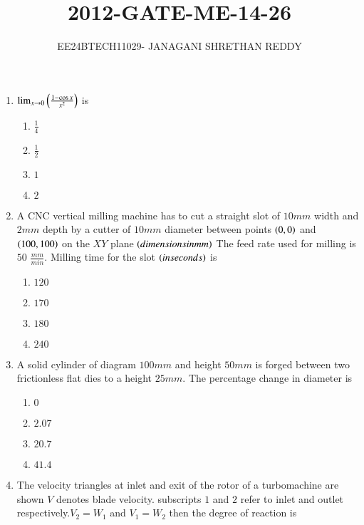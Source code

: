 \documentclass[journal]{IEEEtran}
\begin{document}
 


\vspace{3cm}

\title{2012-GATE-ME-14-26}
\author{EE24BTECH11029- JANAGANI SHRETHAN REDDY}
\maketitle{}
\bigskip
\renewcommand{\thefigure}{\theenumi}
\renewcommand{\thetable}{\theenum}
\begin{enumerate}
    \item $\lim_{x\to 0}\left(\frac{1-\cos{x}}{x^2}\right)$ is
    \begin{enumerate}
        \item $\frac{1}{4}$
        \item $\frac{1}{2}$
        \item $1$
        \item $2$
    \end{enumerate}
    \item A CNC vertical milling machine has to cut a straight slot of $10 mm$ width and $2 mm$ depth by a cutter of $10 mm$ diameter between points $\left(0, 0\right)$ and $\left(100, 100\right)$ on the $XY$ plane $\left(dimensions in mm\right)$ The feed rate used for milling is $50$ $\frac{mm}{min}.$ Milling time for the slot $\left(in seconds\right)$ is
    \begin{enumerate}
        \item $120$
        \item $170$
        \item $180$
        \item $240$
    \end{enumerate}
    \item A solid cylinder of diagram $100 mm$ and height $50 mm$ is forged between two frictionless flat dies to a height $25mm$. The percentage change in diameter is
    \begin{enumerate}
        \item $0$
        \item $2.07$
        \item $20.7$
        \item $41.4$
    \end{enumerate}
    \item The velocity triangles at inlet and exit of the rotor of a turbomachine are shown $V$ denotes blade velocity. subscripts $1$ and $2$ refer to inlet and outlet respectively.$V_2=W_1$ and $V_1=W_2$ then the degree of reaction is



\end{enumerate}
\end{document}
